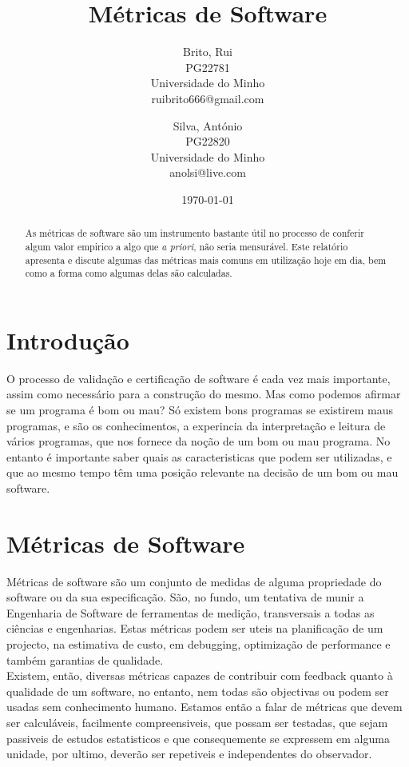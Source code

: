 \documentclass[a4paper,10pt,openright,openbib,twocolumn]{article}
\begin{document}
\title{Métricas de Software}
\date{\today}
\begin{multicols}{2}
\author{
    Brito, Rui\\
    PG22781\\
    Universidade do Minho\\
    ruibrito666@gmail.com
  \and
    Silva, António\\
    PG22820\\
    Universidade do Minho\\
    anolsi@live.com
}
\date{}
\maketitle
\end{multicols}

\begin{abstract}
As métricas de software são um instrumento bastante útil no processo de conferir algum valor empirico a algo que \emph{a priori}, não seria mensurável. Este relatório apresenta e discute algumas das métricas mais comuns em utilização hoje em dia, bem como a forma como algumas delas são calculadas. 
\end{abstract}

\section{Introdução} 
O processo de validação e certificação de software é cada vez mais importante, assim como necessário para a construção do mesmo.
Mas como podemos afirmar se um programa  é bom ou mau? Só existem bons programas se existirem maus programas, e são os conhecimentos, a experincia da interpretação e leitura de vários programas, que nos fornece da noção de um bom ou mau programa.
No entanto  é importante saber quais as caracteristicas que podem ser utilizadas, e que ao mesmo tempo têm uma posição relevante na decisão de um bom ou mau software.
\section{Métricas de Software}
\label{sec:swmetrics}
Métricas de software são um conjunto de medidas de alguma propriedade do software ou da sua especificação. São, no fundo, um tentativa de munir a Engenharia de Software de ferramentas de medição, transversais a todas as ciências e engenharias. Estas métricas podem ser uteis na planificação de um projecto, na estimativa de custo, em debugging, optimização de performance e também garantias de qualidade.\\
Existem, então, diversas métricas capazes de contribuir com feedback quanto à qualidade de um software, no entanto, nem todas são objectivas ou podem ser usadas sem conhecimento humano. Estamos então a falar de métricas que devem ser calculáveis, facilmente compreensiveis, que possam ser testadas, que sejam passiveis de estudos estatisticos e que consequemente se expressem em alguma unidade, por ultimo, deverão ser repetiveis e independentes do observador.
\end{document}
